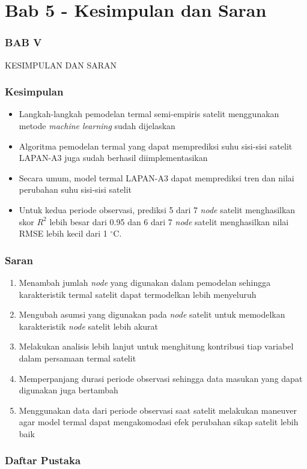 \documentclass[8pt]{beamer}
\begin{document}
\section{Bab 5 - Kesimpulan dan Saran}
\begin{frame}
  \frametitle{BAB V}
  \center \large KESIMPULAN DAN SARAN
\end{frame}
\begin{frame}
  \frametitle{Kesimpulan}
  \begin{itemize}
    \item Langkah-langkah pemodelan termal semi-empiris satelit menggunakan metode \textit{machine learning} sudah dijelaskan
    \item Algoritma pemodelan termal yang dapat memprediksi suhu sisi-sisi satelit LAPAN-A3 juga sudah berhasil diimplementasikan
    \item Secara umum, model termal LAPAN-A3 dapat memprediksi tren dan nilai perubahan suhu sisi-sisi satelit
    \item Untuk kedua periode observasi, prediksi 5 dari 7 \textit{node} satelit menghasilkan skor $R^2$ lebih besar dari 0.95 dan 6 dari 7 \textit{node} satelit menghasilkan nilai RMSE lebih kecil dari 1 $^\circ$C.
  \end{itemize}
\end{frame}

\begin{frame}
  \frametitle{Saran}
\begin{enumerate}
\item Menambah jumlah \textit{node} yang digunakan dalam pemodelan sehingga karakteristik termal satelit dapat termodelkan lebih menyeluruh
\item Mengubah asumsi yang digunakan pada \textit{node} satelit untuk memodelkan karakteristik \textit{node} satelit lebih akurat
\item Melakukan analisis lebih lanjut untuk menghitung kontribusi tiap variabel dalam persamaan termal satelit
\item Memperpanjang durasi periode observasi sehingga data masukan yang dapat digunakan juga bertambah
\item Menggunakan data dari periode observasi saat satelit melakukan maneuver agar model termal dapat mengakomodasi efek perubahan sikap satelit lebih baik
\end{enumerate}
\end{frame}


\begin{frame}
  \frametitle{Daftar Pustaka}
  \tiny
  
\end{frame}
\end{document}
